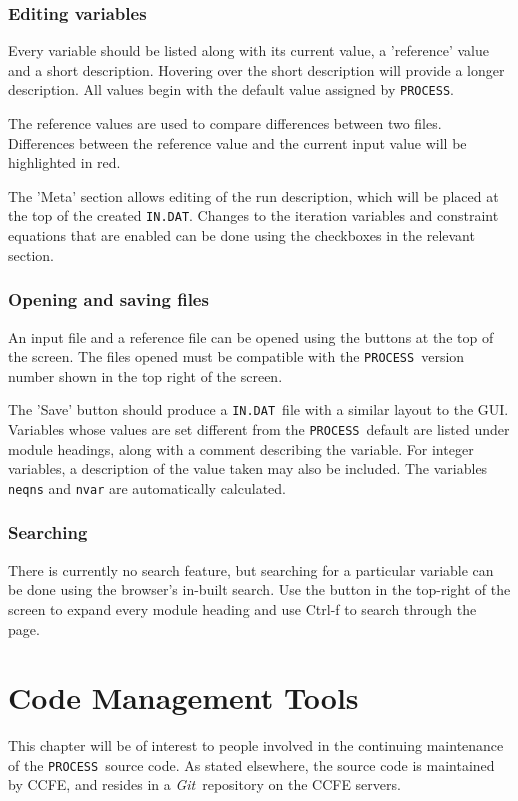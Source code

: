 \documentclass[11pt,a4paper]{report}
\newcommand{\indat}{\mbox{\texttt{IN.DAT}}}
\newcommand{\process}{\mbox{\texttt{PROCESS}}}
\newcommand{\setheader}[1]
 {\markright{\rlap{\lower0.8ex\hbox to\textwidth{\hrulefill}}{\bf#1}}}
\newcommand{\mychapter}[1]{\small\normalsize
 \setcounter{footnote}{0}
 \chapter{#1}
 \pagestyle{myheadings}
 \setheader{Chapter \thechapter\hspace{0.8em}#1}}
\begin{document}
\subsection{Editing variables}
Every variable should be listed along with its current value, a 'reference'
value and a short description. Hovering over the short description will
provide a longer description. All values begin with the default value
assigned by \process. 

The reference values are used to compare differences between two files.
Differences between the reference value and the current input value will be
highlighted in red.

The 'Meta' section allows editing of the run description, which will be placed
at the top of the created \indat. Changes to the iteration variables and
constraint equations that are enabled can be done using the checkboxes in the
relevant section.

\subsection{Opening and saving files}
An input file and a reference file can be opened using the buttons at the top
of the screen. The files opened must be compatible with the \process\ version
number shown in the top right of the screen.

The 'Save' button should produce a \indat\ file with a similar
layout to the GUI. Variables whose values are set different from the
\process\ default are listed under module headings, along with a comment
describing the variable. For integer variables, a description of the value
taken may also be included. The variables \texttt{neqns} and \texttt{nvar} are automatically
calculated.

\subsection{Searching}
There is currently no search feature, but searching for a particular
variable can be done using the browser's in-built search. Use the button
in the top-right of the screen to expand every module heading and use Ctrl-f
to search through the page.


\mychapter{Code Management Tools}
\label{chap:codetools}

This chapter will be of interest to people involved in the continuing
maintenance of the \process\ source code. As stated elsewhere, the source code
is maintained by CCFE, and resides in a \textit{Git}\
repository on the CCFE servers.
\end{document}
